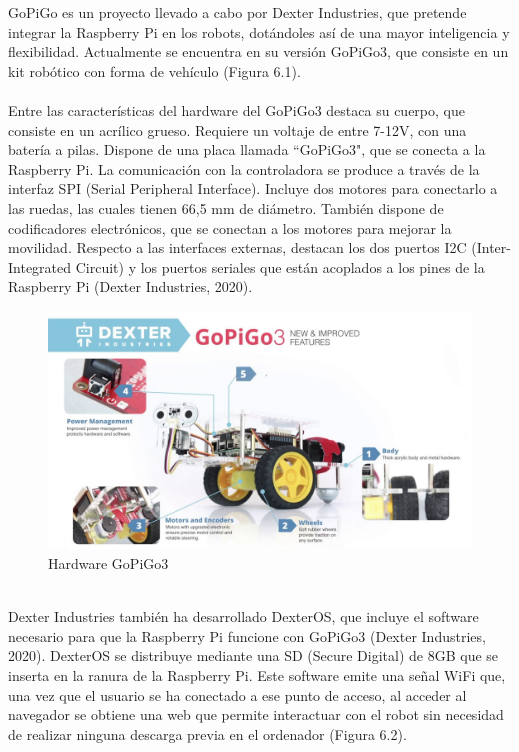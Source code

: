 \documentclass{report}
\begin{document}
GoPiGo es un proyecto llevado a cabo por Dexter Industries, que pretende integrar la Raspberry Pi en los robots, dotándoles así de una mayor inteligencia y flexibilidad. Actualmente se encuentra en su versión GoPiGo3, que consiste en un kit robótico con forma de vehículo (Figura 6.1).
\\
\\
Entre las características del hardware del GoPiGo3 destaca su cuerpo, que consiste en un acrílico grueso. Requiere un voltaje de entre 7-12V, con una batería a pilas. Dispone de una placa llamada “GoPiGo3", que se conecta a la Raspberry Pi. La comunicación con la controladora se produce a través de la interfaz SPI (Serial Peripheral Interface). Incluye dos motores para conectarlo a las ruedas, las cuales tienen 66,5 mm de diámetro. También dispone de codificadores electrónicos, que se conectan a los motores para mejorar la movilidad. Respecto a las interfaces externas, destacan los dos puertos I2C (Inter-Integrated Circuit) y los puertos seriales que están acoplados a los pines de la Raspberry Pi (Dexter Industries, 2020).
\\
\begin{figure}[h!]
  \centering
    \includegraphics[width=1\textwidth]{images/partes_GoPiGo.png}
  \caption{Hardware GoPiGo3}
  \label{Hardware GoPiGo3}
\end{figure}
\\
Dexter Industries también ha desarrollado DexterOS, que incluye el software necesario para que la Raspberry Pi funcione con GoPiGo3 (Dexter Industries, 2020). DexterOS se distribuye mediante una SD (Secure Digital) de 8GB que se inserta en la ranura de la Raspberry Pi. Este software emite una señal WiFi que, una vez que el usuario se ha conectado a ese punto de acceso, al acceder al navegador se obtiene una web que permite interactuar con el robot sin necesidad de realizar ninguna descarga previa en el ordenador (Figura 6.2).
\end{document}
